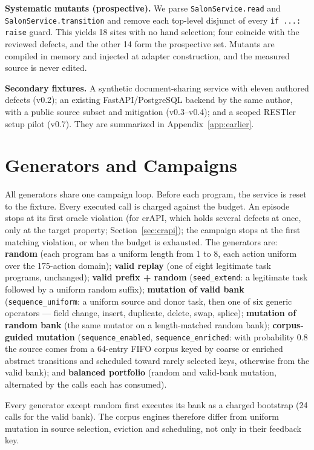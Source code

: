 \documentclass[conference]{IEEEtran}
\begin{document}
\textbf{Systematic mutants (prospective).} We parse \texttt{SalonService.read} and
\texttt{SalonService.transition} and remove each top-level disjunct of every
\texttt{if\,...:\,raise} guard. This yields 18 sites with no hand selection; four coincide
with the reviewed defects, and the other 14 form the prospective set. Mutants are compiled
in memory and injected at adapter construction, and the measured source is never edited.

\textbf{Secondary fixtures.} A synthetic document-sharing service with eleven authored
defects (v0.2); an existing FastAPI/PostgreSQL backend by the same author, with a public
source subset and mitigation (v0.3--v0.4); and a scoped RESTler setup pilot (v0.7). They
are summarized in Appendix~\ref{app:earlier}.

\section{Generators and Campaigns}
All generators share one campaign loop. Before each program, the service is reset to the
fixture. Every executed call is charged against the budget. An episode stops at its first
oracle violation (for crAPI, which holds several defects at once, only at the target
property; Section~\ref{sec:crapi}); the campaign stops at the first matching violation,
or when the budget is exhausted. The generators are: \textbf{random} (each program has a uniform length from
1 to 8, each action uniform over the 175-action domain); \textbf{valid replay} (one of
eight legitimate task programs, unchanged); \textbf{valid prefix + random}
(\texttt{seed\_extend}: a legitimate task followed by a uniform random suffix);
\textbf{mutation of valid bank} (\texttt{sequence\_uniform}: a uniform source and donor
task, then one of six generic operators --- field change, insert, duplicate, delete,
swap, splice); \textbf{mutation of random bank} (the same mutator on a length-matched
random bank); \textbf{corpus-guided mutation} (\texttt{sequence\_enabled},
\texttt{sequence\_enriched}: with probability 0.8 the source comes from a 64-entry FIFO
corpus keyed by coarse or enriched abstract transitions and scheduled toward rarely
selected keys, otherwise from the valid bank); and \textbf{balanced portfolio} (random
and valid-bank mutation, alternated by the calls each has consumed).

Every generator except random first executes its bank as a charged bootstrap (24 calls
for the valid bank). The corpus engines therefore differ from uniform mutation in source
selection, eviction and scheduling, not only in their feedback key.
\end{document}
